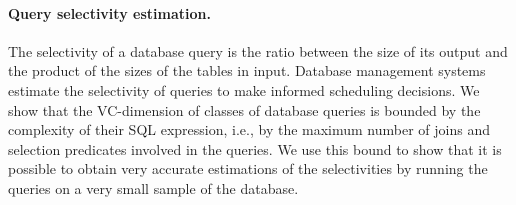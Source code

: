 \paragraph*{Query selectivity estimation.} The selectivity of a database query
is the ratio between the size of its output and the product of the sizes of the
tables in input. Database management systems estimate the selectivity of
queries to make informed scheduling decisions. We show that the VC-dimension of
classes of database queries is bounded by the complexity of their SQL
expression, i.e., by the maximum number of joins and selection predicates
involved in the queries. We use this bound to show that it is possible to
obtain very accurate estimations of the selectivities by running the queries on
a very small sample of the database. 

%
%
%
%
%
%
